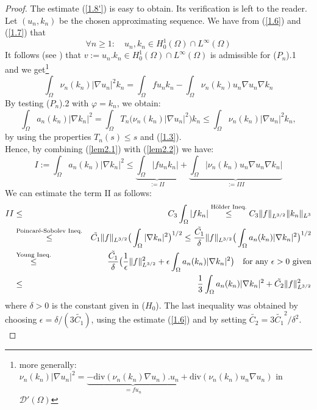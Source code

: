 \documentclass{elsart}
\begin{document}
\begin{proof}
The estimate (\ref{1.8'}) is easy to obtain. Its verification is left
to the reader. \\ 
Let $(u_n,k_n)$ be the chosen approximating sequence. We have from 
(\ref{1.6}) and (\ref{1.7}) that 
$$\forall n \geq 1: \quad u_n,k_n \in H^1_0(\Omega) \cap
L^{\infty}(\Omega)$$
It follows (see \cite{brezis}) that 
$v:=u_n.k_n \in  H^1_0(\Omega) \cap L^{\infty}(\Omega)$ is admissible
for ($P_n$).1 and we get\footnote{more generally: 
$\nu_n(k_n)|\nabla u_n|^2 = \underbrace{-\text{div}(\nu_n(k_n) \nabla
    u_n).u_n}_{=f u_n} + 
\text{div}(\nu_n(k_n) u_n \nabla u_n)$ in $\mathcal{D}'(\Omega)$}
\begin{equation}
\int_{\Omega} \nu_n(k_n)|\nabla u_n |^2 k_n = 
	\int_{\Omega} f u_n k_n -  \int_{\Omega} \nu_n(k_n)u_n\nabla
	u_n \nabla k_n \label{lem2.1}
\end{equation}
By testing ($P_n$).2 with $\varphi=k_n$, we obtain: 
\begin{equation}
\int_{\Omega} a_n(k_n)|\nabla k_n |^2 = 
\int_{\Omega} T_n\big(\nu_n(k_n)| \nabla u_n|^2 \big) k_n \leq 
\int_{\Omega} \nu_n(k_n)|\nabla u_n |^2k_n, \label{lem2.2}
\end{equation}
by using the properties $T_n(s) \leq s$ and (\ref{1.3}). \\ 
Hence, by combining (\ref{lem2.1}) with (\ref{lem2.2}) we have: 
\begin{equation}
I:=\int_{\Omega} a_n(k_n)|\nabla k_n |^2 \leq 
\underbrace{\int_{\Omega} |f u_n k_n|}_{:=II} + 
\underbrace{\int_{\Omega} \big| \nu_n(k_n)u_n\nabla u_n \nabla
  k_n\big|}_{:=III} \label{lem2.3}
\end{equation}
We can estimate the term II as follows: 
\begin{eqnarray} 
II &\leq& C_3 \int_{\Omega} |f k_n| \overset{\text{H\" older Ineq.}}{\leq} C_3 \|f\|_{L^{3/2}}\|k_n\|_{L^3}\notag \\ 
&\overset{\text{Poincar\'e-Sobolev Ineq.}}{\leq}& \tilde{C_1} \|f\|_{L^{3/2}} \big( 
\int_{\Omega} |\nabla k_n |^2\big)^{1/2} \leq  
\frac{\tilde{C_1}}{\delta}\|f\|_{L^{3/2}} \big(\int_{\Omega}
a_n(k_n)|\nabla k_n |^2\big)^{1/2} \notag \\ 
&\overset{\text{Young Ineq.}}{\leq}& \frac{\tilde{C_1}}{\delta} \big(\frac{1}{\epsilon} \|f\|_{L^{3/2}}^2 + \epsilon \int_{\Omega} a_n(k_n)|\nabla k_n |^2 \big) 
\quad \text{for any }\epsilon > 0 \text{ given} \notag \\  
&\leq& \frac{1}{3} \int_{\Omega} a_n(k_n)|\nabla k_n |^2 + 
\tilde{C_2} \|f\|_{L^{3/2}}^2 \notag
\end{eqnarray}
where $\delta > 0$ is the constant given in ($H_0$). The
last inequality was obtained by choosing
$\epsilon=\delta/(3\tilde{C_1})$, using the estimate (\ref{1.6})
and by setting $\tilde{C_2}=3\tilde{C_1}^2/\delta^2$. \\ 


\end{proof}
\end{document}
